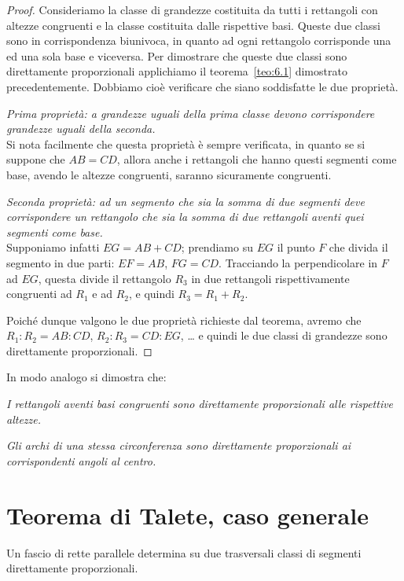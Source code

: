 \begin{proof}
Consideriamo la classe di grandezze costituita da tutti i rettangoli con altezze congruenti e la classe costituita dalle rispettive basi. Queste due classi sono in corrispondenza biunivoca, in quanto ad ogni rettangolo corrisponde una ed una sola base e viceversa.
Per dimostrare che queste due classi sono direttamente proporzionali applichiamo il teorema~\ref{teo:6.1} dimostrato precedentemente. Dobbiamo cioè verificare che siano soddisfatte le due proprietà.

\emph{Prima proprietà: a grandezze uguali della prima classe devono corrispondere grandezze uguali della seconda.}\\
Si nota facilmente che questa proprietà è sempre verificata, in quanto se si suppone che $AB = CD$, allora anche i rettangoli che hanno questi segmenti come base, avendo le altezze congruenti, saranno sicuramente congruenti.

\emph{Seconda proprietà: ad un segmento che sia la somma di due segmenti deve corrispondere un rettangolo che sia la somma di due rettangoli aventi quei segmenti come base.}\\
Supponiamo infatti $EG =  AB + CD$; prendiamo su $EG$ il punto $F$ che divida il segmento in due parti: $EF=AB$, $FG=CD$. Tracciando la perpendicolare in $F$ ad $EG$, questa divide il rettangolo $R_3$ in due rettangoli rispettivamente congruenti ad $R_1$ e ad $R_2$, e quindi $R_3= R_1+R_2$.

Poiché dunque valgono le due proprietà richieste dal teorema, avremo che $R_1 : R_2 = AB : CD$, 
$R_2 : R_3 = CD  : EG$, \ldots{} e quindi le due classi di grandezze sono direttamente proporzionali.
\end{proof}

In modo analogo si dimostra che:
\begin{itemize*}
\item \emph{I rettangoli aventi basi congruenti sono direttamente proporzionali alle rispettive altezze.}
\item \emph{Gli archi di una stessa circonferenza sono direttamente proporzionali ai corrispondenti angoli al centro.}
\end{itemize*}


\section{Teorema di Talete, caso generale}\label{sect:talete_generale}

\begin{teorema}[di Talete]
Un fascio di rette parallele determina su due trasversali classi di segmenti direttamente proporzionali.
\end{teorema}

